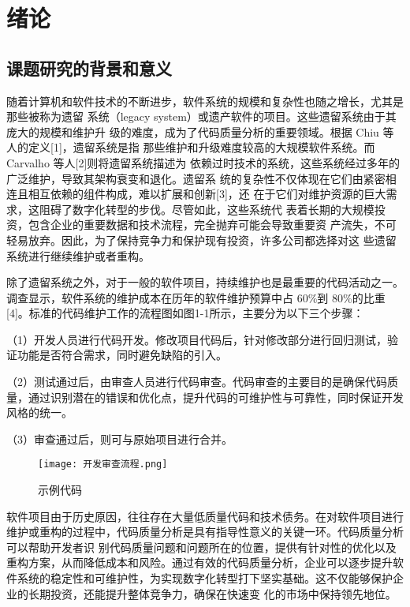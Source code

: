 
\chapter{绪论}

\section{课题研究的背景和意义}

随着计算机和软件技术的不断进步，软件系统的规模和复杂性也随之增长，尤其是那些被称为遗留
系统（legacy system）或遗产软件的项目。这些遗留系统由于其庞大的规模和维护升
级的难度，成为了代码质量分析的重要领域。根据 Chiu 等人的定义[1]，遗留系统是指
那些维护和升级难度较高的大规模软件系统。而 Carvalho 等人[2]则将遗留系统描述为
依赖过时技术的系统，这些系统经过多年的广泛维护，导致其架构衰变和退化。遗留系
统的复杂性不仅体现在它们由紧密相连且相互依赖的组件构成，难以扩展和创新[3]，还
在于它们对维护资源的巨大需求，这阻碍了数字化转型的步伐。尽管如此，这些系统代
表着长期的大规模投资，包含企业的重要数据和技术流程，完全抛弃可能会导致重要资
产流失，不可轻易放弃。因此，为了保持竞争力和保护现有投资，许多公司都选择对这
些遗留系统进行继续维护或者重构。

除了遗留系统之外，对于一般的软件项目，持续维护也是最重要的代码活动之一。调查显示，软件系统的维护成本在历年的软件维护预算中占 60\%到 80\%的比重[4]。标准的代码维护工作的流程图如图1-1所示，主要分为以下三个步骤：

（1）开发人员进行代码开发。修改项目代码后，针对修改部分进行回归测试，验证功能是否符合需求，同时避免缺陷的引入。

（2）测试通过后，由审查人员进行代码审查。代码审查的主要目的是确保代码质量，通过识别潜在的错误和优化点，提升代码的可维护性与可靠性，同时保证开发风格的统一。

（3）审查通过后，则可与原始项目进行合并。

\begin{figure}[h]
\centering
\texttt{[image: 开发审查流程.png]}
\caption{示例代码}
\end{figure}

软件项目由于历史原因，往往存在大量低质量代码和技术债务。在对软件项目进行维护或重构的过程中，代码质量分析是具有指导性意义的关键一环。代码质量分析可以帮助开发者识
别代码质量问题和问题所在的位置，提供有针对性的优化以及重构方案，从而降低成本和风险。通过有效的代码质量分析，企业可以逐步提升软件系统的稳定性和可维护性，为实现数字化转型打下坚实基础。这不仅能够保护企业的长期投资，还能提升整体竞争力，确保在快速变
化的市场中保持领先地位。

